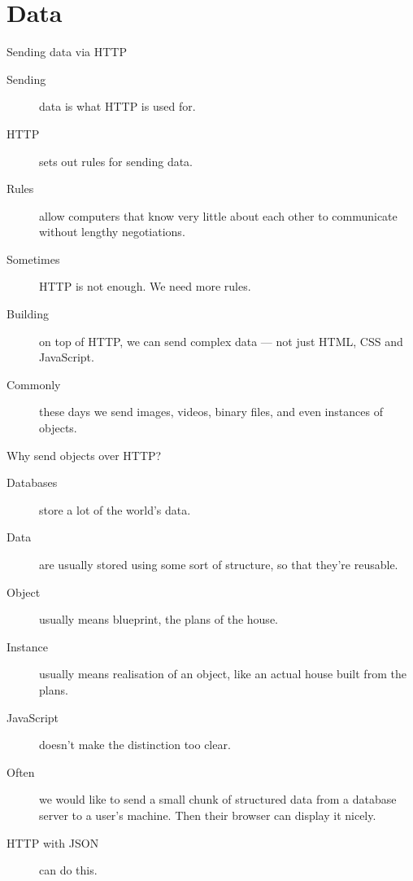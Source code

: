 \documentclass{beamer}
\begin{document}
\section{Data}


\begin{frame}{Sending data via HTTP}
  \begin{description}
    \item[Sending] data is what HTTP is used for.
    \item[HTTP] sets out rules for sending data.
    \item[Rules] allow computers that know very little about each other to communicate without lengthy negotiations.
    \item[Sometimes] HTTP is not enough. We need more rules.
    \item[Building] on top of HTTP, we can send complex data --- not just HTML, CSS and JavaScript.
    \item[Commonly] these days we send images, videos, binary files, and even instances of objects.
  \end{description}
\end{frame}


\begin{frame}{Why send objects over HTTP?}
  \begin{description}
    \item[Databases] store a lot of the world's data.
    \item[Data] are usually stored using some sort of structure, so that they're reusable.
    \item[Object] usually means blueprint, the plans of the house.
    \item[Instance] usually means realisation of an object, like an actual house built from the plans.
    \item[JavaScript] doesn't make the distinction too clear.
    \item[Often] we would like to send a small chunk of structured data from a database server to a user's machine. Then their browser can display it nicely.
    \item[HTTP with JSON] can do this. 
  \end{description}
\end{frame}
\end{document}
